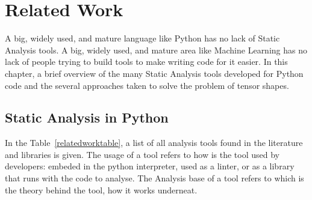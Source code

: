 \chapter{Related Work}\label{related-work}

A big, widely used, and mature language like Python has no lack of Static Analysis tools.
A big, widely used, and mature area like Machine Learning has no lack of people trying to
build tools to make writing code for it easier. In this chapter, a brief overview of the
many Static Analysis tools developed for Python code and the several approaches taken to
solve the problem of tensor shapes.

\section{Static Analysis in Python}


In the Table~\ref{relatedworktable}, a list of all analysis tools found in the literature
and libraries is given. The usage of a tool refers to how is the tool used by developers:
embeded in the python interpreter, used as a linter, or as a library that runs with the
code to analyse. The Analysis base of a tool refers to which is the theory behind the
tool, how it works underneat.

